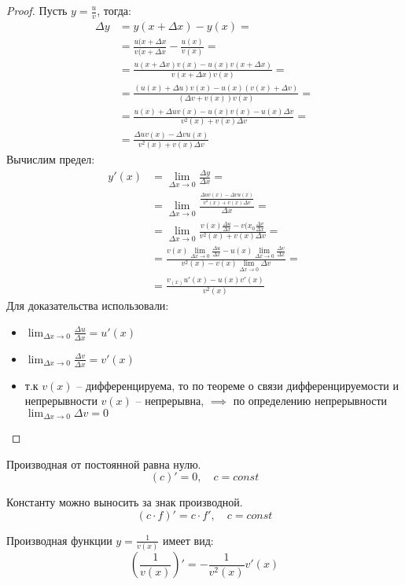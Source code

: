 \begin{proof}
  Пусть $y = \frac{u}{v}$, тогда:
  \begin{align*}
    \Delta y &= y(x + \Delta x) - y(x) = \\
        &= \frac{u(x + \Delta x}{v(x + \Delta x} - \frac{u(x)}{v(x)} = \\
        &= \frac{u(x + \Delta x)v(x) - u(x)v(x + \Delta x)}{v(x + \Delta x)v(x)} = \\
        &= \frac{(u(x) + \Delta u)v(x) - u(x)(v(x) + \Delta v)}{(\Delta v + v(x))v(x)} = \\
        &= \frac{u(x) + \Delta u v(x) - u(x)v(x) - u(x)\Delta v}{v^2(x) + v(x) \Delta v} = \\
        &= \frac{\Delta u v(x) - \Delta v u(x)}{v^2(x) + v(x) \Delta v}
  \end{align*}
  Вычислим предел:
  \begin{align*}
    y'(x) &= \lim_{\Delta x \to 0} \frac{\Delta y}{\Delta x} = \\
          &= \lim_{\Delta x \to 0} \frac{\frac{\Delta u v(x) - \Delta v u(x)}{v^2(x) + v(x) \Delta v}}{\Delta x} = \\
          &= \lim_{\Delta x \to 0} \frac{v(x) \frac{\Delta u}{\Delta x} - v(x_0 \frac{\Delta v}{\Delta x}}{v^2(x) + v(x) \Delta v} = \\
          &= \frac{v(x) \lim_{\Delta x \to 0} \frac{\Delta u}{\Delta x} - u(x) \lim_{\Delta x \to 0}  \frac{\Delta v}{\Delta x}}{v^2(x) - v(x) \lim_{\Delta x \to 0} \Delta v} = \\
          &= \boxed{\frac{v_(x) u'(x) - u(x) v'(x)}{v^2(x)}}
  \end{align*}
  Для доказательства использовали:
  \begin{itemize}
    \item $\lim_{\Delta x \to 0} \frac{\Delta u}{\Delta x} = u'(x)$
    \item $\lim_{\Delta x \to 0} \frac{\Delta v}{\Delta x} = v'(x)$
    \item т.к $v(x)$ -- дифференцируема, то по теореме о связи дифференцируемости и непрерывности  $v(x)$ -- непрерывна,  $\implies $ по определению непрерывности $\lim_{\Delta x \to 0} \Delta v = 0$
  \end{itemize}
\end{proof}

\begin{theorem}
  Производная от постоянной равна нулю. \[
    (c)' = 0, \quad c = const
  \] 
\end{theorem}
\begin{corollary}
  Константу можно выносить за знак производной. \[
    (c \cdot f)' = c \cdot f', \quad c = const
  \] 
\end{corollary}
\begin{corollary}
  Производная функции $y = \frac{1}{v(x)}$ имеет вид: \[
  \left( \frac{1}{v(x)} \right)' = -\frac{1}{v^2(x)}v'(x)
  \]  
\end{corollary}

